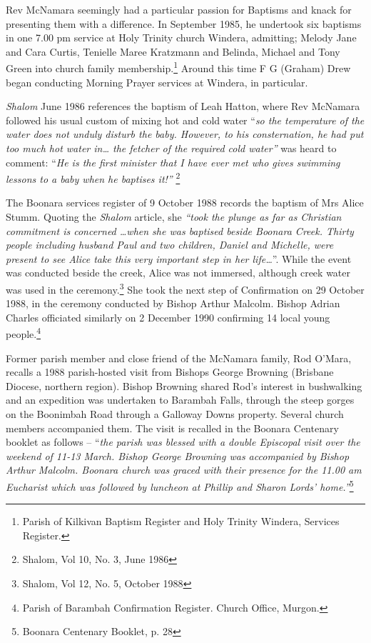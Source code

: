Rev McNamara seemingly had a particular passion for Baptisms and knack for presenting them with a difference. In September 1985, he undertook six baptisms in one 7.00 pm service at Holy Trinity church Windera, admitting; Melody Jane and Cara Curtis, Tenielle Maree Kratzmann and Belinda, Michael and Tony Green into church family membership.\footnote{Parish of Kilkivan Baptism Register and Holy Trinity Windera, Services Register.} Around this time F G (Graham) Drew began conducting Morning Prayer services at Windera, in particular.

\emph{Shalom} June 1986 references the baptism of Leah Hatton, where Rev McNamara followed his usual custom of mixing hot and cold water ``\emph{so the temperature of the water does not unduly disturb the baby. However, to his consternation, he had put too much hot water in\ldots{} the fetcher of the required cold water''} was heard to comment: ``\emph{He is the first minister that I have ever met who gives swimming lessons to a baby when he baptises it!''} \footnote{Shalom, Vol 10, No. 3, June 1986}

The Boonara services register of 9 October 1988 records the baptism of Mrs Alice Stumm. Quoting the \emph{Shalom} article, she \emph{``took the plunge as far as Christian commitment is concerned \ldots when she was baptised beside Boonara Creek. Thirty people including husband Paul and two children, Daniel and Michelle, were present to see Alice take this very important step in her life\ldots{}}''. While the event was conducted beside the creek, Alice was not immersed, although creek water was used in the ceremony.\footnote{Shalom, Vol 12, No. 5, October 1988} She took the next step of Confirmation on 29 October 1988, in the ceremony conducted by Bishop Arthur Malcolm. Bishop Adrian Charles officiated similarly on 2 December 1990 confirming 14 local young people.\footnote{Parish of Barambah Confirmation Register. Church Office, Murgon.}

Former parish member and close friend of the McNamara family, Rod O'Mara, recalls a 1988 parish-hosted visit from Bishops George Browning (Brisbane Diocese, northern region). Bishop Browning shared Rod's interest in bushwalking and an expedition was undertaken to Barambah Falls, through the steep gorges on the Boonimbah Road through a Galloway Downs property. Several church members accompanied them. The visit is recalled in the Boonara Centenary booklet as follows -- ``\emph{the parish was blessed with a double Episcopal visit over the weekend of 11-13 March. Bishop George Browning was accompanied by Bishop Arthur Malcolm. Boonara church was graced with their presence for the 11.00 am Eucharist which was followed by luncheon at Phillip and Sharon Lords' home.''}\footnote{Boonara Centenary Booklet, p. 28}

